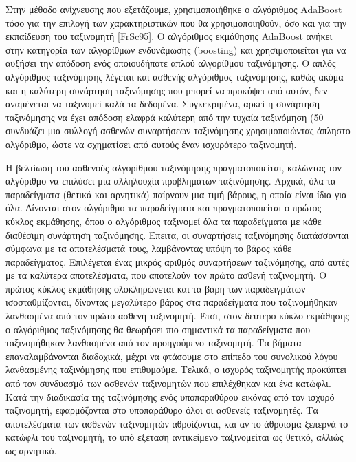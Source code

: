 Στην μέθοδο ανίχνευσης που εξετάζουμε, χρησιμοποιήθηκε ο αλγόριθμος AdaBoost τόσο για
την επιλογή των χαρακτηριστικών που θα χρησιμοποιηθούν, όσο και για την εκπαίδευση του
ταξινομητή [FrSc95]. Ο αλγόριθμος εκμάθησης AdaBoost ανήκει στην κατηγορία των
αλγορίθμων ενδυνάμωσης (boosting) και χρησιμοποιείται για να αυξήσει την απόδοση ενός
οποιουδήποτε απλού αλγορίθμου ταξινόμησης. Ο απλός αλγόριθμος ταξινόμησης λέγεται και
ασθενής αλγόριθμος ταξινόμησης, καθώς ακόμα και η καλύτερη συνάρτηση ταξινόμησης που
μπορεί να προκύψει από αυτόν, δεν αναμένεται να ταξινομεί καλά τα δεδομένα. Συγκεκριμένα,
αρκεί η συνάρτηση ταξινόμησης να έχει απόδοση ελαφρά καλύτερη από την τυχαία ταξινόμηση
(50%
συνδυάζει μια συλλογή ασθενών συναρτήσεων ταξινόμησης χρησιμοποιώντας άπληστο αλγόριθμο,
ώστε να σχηματίσει από αυτούς έναν ισχυρότερο ταξινομητή.

Η βελτίωση του ασθενούς αλγορίθμου ταξινόμησης πραγματοποιείται, καλώντας τον
αλγόριθμο να επιλύσει μια αλληλουχία προβλημάτων ταξινόμησης. Αρχικά, όλα τα παραδείγματα
(θετικά και αρνητικά) παίρνουν μια τιμή βάρους, η οποία είναι ίδια για όλα. ∆ίνονται στον
αλγόριθμο τα παραδείγματα και πραγματοποιείται ο πρώτος κύκλος εκμάθησης, όπου ο
αλγόριθμος ταξινομεί όλα τα παραδείγματα με κάθε διαθέσιμη συνάρτηση ταξινόμησης. Έπειτα,
οι συναρτήσεις ταξινόμησης διατάσσονται σύμφωνα με τα αποτελέσματά τους, λαμβάνοντας υπόψη
το βάρος κάθε παραδείγματος. Επιλέγεται ένας μικρός αριθμός συναρτήσεων ταξινόμησης, από
αυτές με τα καλύτερα αποτελέσματα, που αποτελούν τον πρώτο ασθενή ταξινομητή. Ο πρώτος
κύκλος εκμάθησης ολοκληρώνεται και τα βάρη των παραδειγμάτων ισοσταθμίζονται, δίνοντας
μεγαλύτερο βάρος στα παραδείγματα που ταξινομήθηκαν λανθασμένα από τον πρώτο ασθενή
ταξινομητή. Έτσι, στον δεύτερο κύκλο εκμάθησης ο αλγόριθμος ταξινόμησης θα θεωρήσει πιο
σημαντικά τα παραδείγματα που ταξινομήθηκαν λανθασμένα από τον προηγούμενο ταξινομητή.
Τα βήματα επαναλαμβάνονται διαδοχικά, μέχρι να φτάσουμε στο επίπεδο του συνολικού λόγου
λανθασμένης ταξινόμησης που επιθυμούμε. Τελικά, ο ισχυρός ταξινομητής προκύπτει από τον
συνδυασμό των ασθενών ταξινομητών που επιλέχθηκαν και ένα κατώφλι. Κατά την διαδικασία της
ταξινόμησης ενός υποπαραθύρου εικόνας από τον ισχυρό ταξινομητή, εφαρμόζονται στο
υποπαράθυρο όλοι οι ασθενείς ταξινομητές. Τα αποτελέσματα των ασθενών ταξινομητών
αθροίζονται, και αν το άθροισμα ξεπερνά το κατώφλι του ταξινομητή, το υπό εξέταση αντικείμενο
ταξινομείται ως θετικό, αλλιώς ως αρνητικό.

